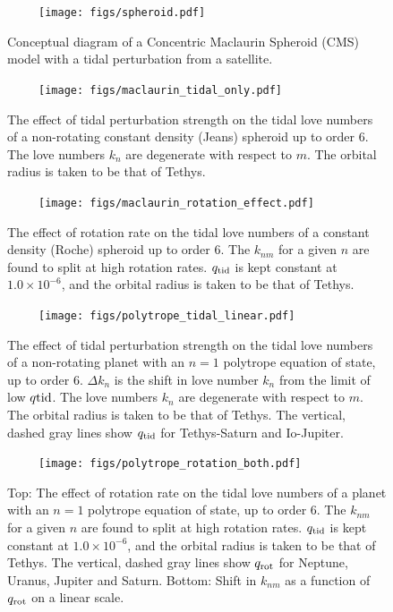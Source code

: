 \begin{figure}[h!]  
  \centering
    \texttt{[image: figs/spheroid.pdf]}
\caption{ Conceptual diagram of a Concentric Maclaurin Spheroid (CMS) model with a tidal
perturbation from a satellite.}
\label{fig:spheroid}
\end{figure}

\begin{figure}[h!]  
  \centering
    \texttt{[image: figs/maclaurin\_tidal\_only.pdf]}
\caption{ The effect of tidal perturbation strength on the tidal love numbers of a
non-rotating constant density (Jeans) spheroid up to order 6. The love numbers $k_n$ are degenerate
with respect to $m$. The orbital radius is taken to be that of Tethys.}
\label{fig:maclaurin_tidal_only}
\end{figure}

\begin{figure}[h!]  
  \centering
    \texttt{[image: figs/maclaurin\_rotation\_effect.pdf]}
\caption{ The effect of rotation rate on the tidal love numbers of a constant density
    (Roche) spheroid up to order 6. The $k_{nm}$ for a given $n$ are found to split
    at high rotation rates. $q_{\rm tid}$ is kept constant at $1.0\times10^{-6}$, and
    the orbital radius is taken to be that of Tethys.}
\label{fig:maclaurin_rotation_effect}
\end{figure}

\begin{figure}[h!]  
  \centering
    \texttt{[image: figs/polytrope\_tidal\_linear.pdf]}
\caption{ The effect of tidal perturbation strength on the tidal love numbers of a
    non-rotating planet with an $n=1$ polytrope equation of state, up to order 6.
    $\Delta k_n$ is the shift in love number $k_n$ from the limit of low $q{\rm
    tid}$. The love numbers $k_n$ are degenerate with respect to $m$. The orbital
    radius is taken to be that of Tethys. The vertical, dashed gray lines show $q_{\rm tid}$
    for Tethys-Saturn and Io-Jupiter.}
\label{fig:polytrope_tidal_only}
\end{figure}

\begin{figure}[h!]  
  \centering
    \texttt{[image: figs/polytrope\_rotation\_both.pdf]}
\caption{ Top: The effect of rotation rate on the tidal love numbers of a planet with an
    $n=1$ polytrope equation of state, up to order 6. The $k_{nm}$ for a given $n$
    are found to split at high rotation rates. $q_{\rm tid}$ is kept constant at
    $1.0\times10^{-6}$, and the orbital radius is taken to be that of Tethys. The
    vertical, dashed gray lines show $q_{\rm rot}$ for Neptune, Uranus, Jupiter and Saturn.
    Bottom: Shift in $k_{nm}$ as a function of $q_{\rm rot}$ on a linear scale.}
\label{fig:polytrope_rotation_effect}
\end{figure}

